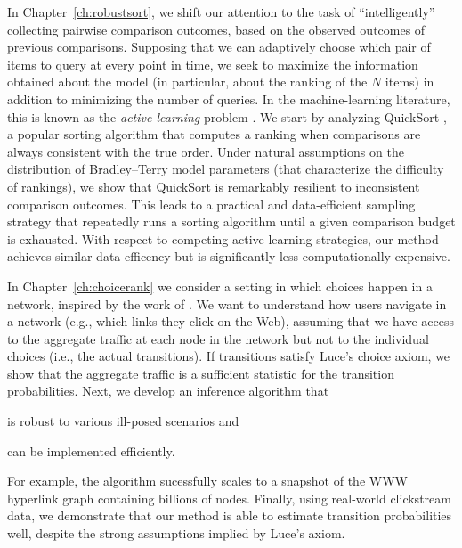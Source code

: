 In Chapter~\ref{ch:robustsort}, we shift our attention to the task of ``intelligently'' collecting pairwise comparison outcomes, based on the observed outcomes of previous comparisons.
Supposing that we can adaptively choose which pair of items to query at every point in time, we seek to maximize the information obtained about the model (in particular, about the ranking of the $N$ items) in addition to minimizing the number of queries.
In the machine-learning literature, this is known as the \emph{active-learning} problem \citep{settles2012active}.
We start by analyzing QuickSort \citep{hoare1962quicksort}, a popular sorting algorithm that computes a ranking when comparisons are always consistent with the true order.
Under natural assumptions on the distribution of Bradley--Terry model parameters (that characterize the difficulty of rankings), we show that QuickSort is remarkably resilient to inconsistent comparison outcomes.
This leads to a practical and data-efficient sampling strategy that repeatedly runs a sorting algorithm until a given comparison budget is exhausted.
With respect to competing active-learning strategies, our method achieves similar data-efficency but is significantly less computationally expensive.

In Chapter~\ref{ch:choicerank} we consider a setting in which choices happen in a network, inspired by the work of \citet{kumar2015inverting}.
We want to understand how users navigate in a network (e.g., which links they click on the Web), assuming that we have access to the aggregate traffic at each node in the network but not to the individual choices (i.e., the actual transitions).
If transitions satisfy Luce's choice axiom, we show that the aggregate traffic is a sufficient statistic for the transition probabilities.
Next, we develop an inference algorithm that
\begin{enuminline}
\item is robust to various ill-posed scenarios and
\item can be implemented efficiently.
\end{enuminline}
For example, the algorithm sucessfully scales to a snapshot of the WWW hyperlink graph containing billions of nodes.
Finally, using real-world clickstream data, we demonstrate that our method is able to estimate transition probabilities well, despite the strong assumptions implied by Luce's axiom.


